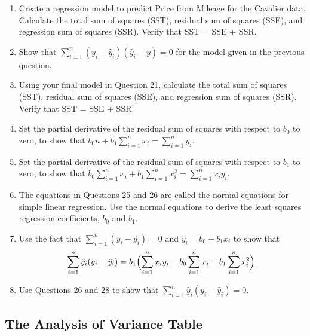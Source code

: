 \documentclass[
]{report}
\providecommand{\tightlist}{%
  \setlength{\itemsep}{0pt}\setlength{\parskip}{0pt}}
\begin{document}
\begin{enumerate}
\def\labelenumi{\arabic{enumi}.}
\setcounter{enumi}{21}
\tightlist
\item
  Create a regression model to predict Price from Mileage for the Cavalier data. Calculate the total sum of squares (SST), residual sum of squares (SSE), and regression sum of squares (SSR). Verify that SST = SSE + SSR.\\
\item
  Show that \(\sum_{i=1}^n (y_i - \hat{y}_i)(\hat{y}_i - \bar{y}) = 0\) for the model given in the previous question.\\
\item
  Using your final model in Question 21, calculate the total sum of squares (SST), residual sum of squares (SSE), and regression sum of squares (SSR). Verify that SST = SSE + SSR.\\
\item
  Set the partial derivative of the residual sum of squares with respect to \(b_0\) to zero, to show that \(b_0 n + b_1 \sum_{i=1}^n x_i = \sum_{i=1}^n y_i.\)
\item
  Set the partial derivative of the residual sum of squares with respect to \(b_1\) to zero, to show that \(b_0 \sum_{i=1}^n x_i + b_1 \sum_{i=1}^n x_i^2 = \sum_{i=1}^n x_i y_i.\)
\item
  The equations in Questions 25 and 26 are called the normal equations for simple linear regression. Use the normal equations to derive the least squares regression coefficients, \(b_0\) and \(b_1\).\\
\item
  Use the fact that \(\sum_{i=1}^n (y_i - \hat{y}_i) = 0\) and \(\hat{y}_i = b_0 + b_1 x_i\) to show that
  \begin{equation}
  \sum_{i=1}^n \hat{y}_i (y_i - \hat{y}_i)
    = b_1 \Bigl(\sum_{i=1}^n x_i y_i - b_0 \sum_{i=1}^n x_i - b_1 \sum_{i=1}^n x_i^2\Bigr). \notag
  \end{equation}
\item
  Use Questions 26 and 28 to show that \(\sum_{i=1}^n \hat{y}_i (y_i - \hat{y}_i) = 0.\)
\end{enumerate}

\hypertarget{the-analysis-of-variance-table}{%
\subsection*{The Analysis of Variance Table}\label{the-analysis-of-variance-table}}
\end{document}
